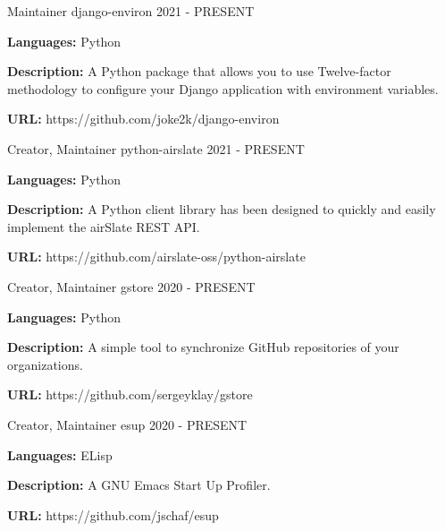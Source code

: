 
\begin{cventries}

  \cventry
    {Maintainer}
    {django-environ}
    {}
    {2021 - PRESENT}
    {
      \begin{cvitems}
        \item {\textbf{Languages:} Python}
        \item {\textbf{Description:} A Python package that allows you to use Twelve-factor methodology to configure your Django application with environment variables.}
        \item {\textbf{URL:} https://github.com/joke2k/django-environ}
      \end{cvitems}
    }

  \cventry
    {Creator, Maintainer}
    {python-airslate}
    {}
    {2021 - PRESENT}
    {
      \begin{cvitems}
        \item {\textbf{Languages:} Python}
        \item {\textbf{Description:} A Python client library has been designed to quickly and easily implement the airSlate REST API.}
        \item {\textbf{URL:} https://github.com/airslate-oss/python-airslate}
      \end{cvitems}
    }

  \cventry
    {Creator, Maintainer}
    {gstore}
    {}
    {2020 - PRESENT}
    {
      \begin{cvitems}
        \item {\textbf{Languages:} Python}
        \item {\textbf{Description:} A simple tool to synchronize GitHub repositories of your organizations.}
        \item {\textbf{URL:} https://github.com/sergeyklay/gstore}
      \end{cvitems}
    }

  \cventry
    {Creator, Maintainer}
    {esup}
    {}
    {2020 - PRESENT}
    {
      \begin{cvitems}
        \item {\textbf{Languages:} ELisp}
        \item {\textbf{Description:} A GNU Emacs Start Up Profiler.}
        \item {\textbf{URL:} https://github.com/jschaf/esup}
      \end{cvitems}
    }


\end{cventries}
